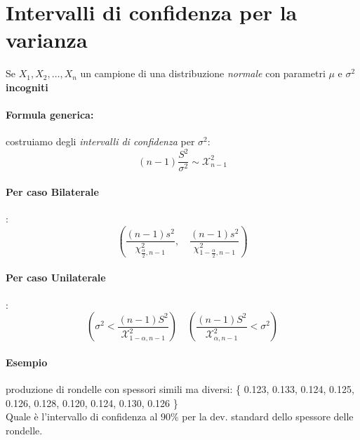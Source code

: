 \documentclass[]{article}
\newcommand{\formula}{\paragraph{Formula generica:}}
\begin{document}
    \section{Intervalli di confidenza per la varianza} 
    Se $X_1, X_2, \ldots, X_n$ un campione di una distribuzione \textit{normale} con parametri $\mu$ e $\sigma^2$ \textbf{incogniti}
    \formula costruiamo degli \textit{intervalli di confidenza} per $\sigma^2$: 
    \[ (n-1) \frac{S^2}{\sigma^2} \sim \mathcal{X}^2_{n-1}  \]
    \paragraph{Per caso Bilaterale}:
    \begin{equation}
        \left(\frac{(n-1) s^2}{\chi_{\frac{\alpha}{2}, n-1}^2}, \quad \frac{(n-1) s^2}{\chi_{1-\frac{\alpha}{2}, n-1}^2}\right)
    \end{equation}
    \paragraph{Per caso Unilaterale}:
    \begin{equation}
        \left( \sigma^2  < \frac{(n-1)S^2}{\mathcal{X}^2_{1-\alpha, n-1}}\right) \quad \left( \frac{(n-1)S^2}{\mathcal{X}^2_{\alpha, n-1}} < \sigma^2 \right)
    \end{equation}
    \paragraph{Esempio} produzione di rondelle con spessori simili ma diversi: \{ 0.123, 0.133, 0.124, 0.125, 0.126, 0.128, 0.120, 0.124, 0.130, 0.126 \} \\
    Quale è l'intervallo di confidenza al $90\%$ per la dev. standard dello spessore delle rondelle.
\end{document}
